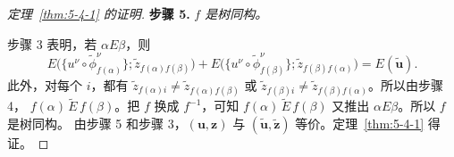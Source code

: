 \begin{proof}[定理~\ref{thm:5-4-1} 的证明]
\medskip
\noindent\textbf{步骤 5.}\quad
\emph{$f$ 是树同构。}

步骤 3 表明，若 $\alpha E\beta$，则
\[
  E\bigl(\{u^\nu\circ\widetilde\phi_{f(\alpha)}^\nu\};
    \widetilde z_{f(\alpha)f(\beta)}\bigr)
  +E\bigl(\{u^\nu\circ\widetilde\phi_{f(\beta)}^\nu\};
    \widetilde z_{f(\beta)f(\alpha)}\bigr)
  =E(\widetilde{\mathbf u}).
\]
此外，对每个 $i$，都有
$\widetilde z_{f(\alpha)i}\ne\widetilde z_{f(\alpha)f(\beta)}$ 或
$\widetilde z_{f(\beta)i}\ne\widetilde z_{f(\beta)f(\alpha)}$。所以由步骤 4，
$f(\alpha)\,\widetilde E\,f(\beta)$。把 $f$ 换成 $f^{-1}$，可知
$f(\alpha)\,\widetilde E\,f(\beta)$ 又推出 $\alpha E\beta$。所以 $f$ 是树同构。
由步骤 5 和步骤 3，$(\mathbf u,\mathbf z)$ 与
$(\widetilde{\mathbf u},\widetilde{\mathbf z})$ 等价。定理~\ref{thm:5-4-1} 得证。
\end{proof}
